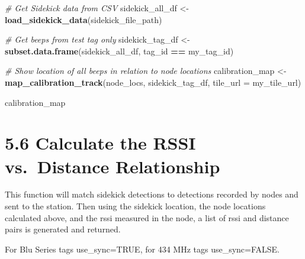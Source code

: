 \documentclass[
]{book}
\newenvironment{Shaded}{\begin{snugshade}}{\end{snugshade}}
\newcommand{\AttributeTok}[1]{\textcolor[rgb]{0.13,0.29,0.53}{#1}}
\newcommand{\CommentTok}[1]{\textcolor[rgb]{0.56,0.35,0.01}{\textit{#1}}}
\newcommand{\FunctionTok}[1]{\textcolor[rgb]{0.13,0.29,0.53}{\textbf{#1}}}
\newcommand{\NormalTok}[1]{#1}
\newcommand{\OtherTok}[1]{\textcolor[rgb]{0.56,0.35,0.01}{#1}}
\newcommand{\SpecialCharTok}[1]{\textcolor[rgb]{0.81,0.36,0.00}{\textbf{#1}}}
\begin{document}
\begin{Shaded}
\begin{Highlighting}[]
\CommentTok{\# Get Sidekick data from CSV}
\NormalTok{sidekick\_all\_df }\OtherTok{\textless{}{-}} \FunctionTok{load\_sidekick\_data}\NormalTok{(sidekick\_file\_path)}

\CommentTok{\# Get beeps from test tag only}
\NormalTok{sidekick\_tag\_df }\OtherTok{\textless{}{-}} \FunctionTok{subset.data.frame}\NormalTok{(sidekick\_all\_df, }
\NormalTok{                                     tag\_id }\SpecialCharTok{==}\NormalTok{ my\_tag\_id)}

\CommentTok{\# Show location of all beeps in relation to node locations}
\NormalTok{calibration\_map }\OtherTok{\textless{}{-}} \FunctionTok{map\_calibration\_track}\NormalTok{(node\_locs, }
\NormalTok{                                         sidekick\_tag\_df, }
                                         \AttributeTok{tile\_url =}\NormalTok{ my\_tile\_url)}

\NormalTok{calibration\_map}
\end{Highlighting}
\end{Shaded}

\section{5.6 Calculate the RSSI vs.~Distance Relationship}\label{calculate-the-rssi-vs.-distance-relationship}

This function will match sidekick detections to detections recorded by nodes and sent to the station. Then using the sidekick location, the node locations calculated above, and the rssi measured in the node, a list of rssi and distance pairs is generated and returned.

For Blu Series tags use\_sync=TRUE, for 434 MHz tags use\_sync=FALSE.
\end{document}
